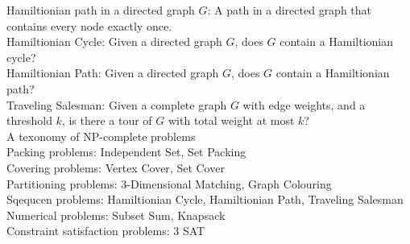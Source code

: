 \documentclass[onecolumn]{report}
\begin{document}
Hamiltionian path in a directed graph $G$: A path in a directed graph that contains every node exactly once.\\
Hamiltionian Cycle: Given a directed graph $G$, does $G$ contain a Hamiltionian cycle?\\
Hamiltionian Path: Given a directed graph $G$, does $G$ contain a Hamiltionian path?\\
Traveling Salesman: Given a complete graph $G$ with edge weights, and a threshold $k$, is there a tour of $G$ with total weight at most $k$?\\
\noindent
A texonomy of NP-complete problems\\
\indent Packing problems: Independent Set, Set Packing\\
\indent Covering problems: Vertex Cover, Set Cover\\
\indent Partitioning problems: 3-Dimensional Matching, Graph Colouring\\
\indent Sqequcen problems: Hamiltionian Cycle, Hamiltionian Path, Traveling Salesman\\
\indent Numerical problems: Subset Sum, Knapsack\\
\indent Constraint satisfaction problems: 3 SAT\\
\end{document}
